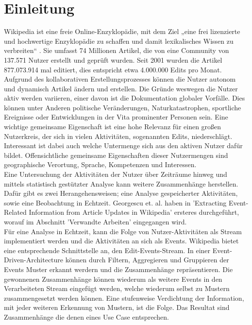 \section{Einleitung}
Wikipedia ist eine freie Online-Enzyklopädie, mit dem Ziel „eine frei lizenzierte und hochwertige Enzyklopädie zu schaffen und damit lexikalisches Wissen zu verbreiten“ \cite{wales.}. Sie umfasst 74 Millionen Artikel, die von eine Community von 137.571 Nutzer erstellt und geprüft wurden. Seit 2001 wurden die Artikel 877.073.914 mal editiert, dies entspricht etwa 4.000.000 Edits pro Monat. \cite{wikistat}\\

Aufgrund des kollaborativen Erstellungsprozesses können die Nutzer autonom und dynamisch Artikel ändern und erstellen. \cite{wikipedia.}
Die Gründe weswegen die Nutzer aktiv werden variieren, einer davon ist die Dokumentation globaler Vorfälle. Dies können unter Anderen politische Veränderungen, Naturkatastrophen, sportliche Ereignisse oder Entwicklungen in der Vita prominenter Personen sein. Eine wichtige gemeinsame Eigenschaft ist eine hohe Relevanz für einen großen Nutzerkreis, der sich in vielen Aktivitäten, sogenannten Edits, niederschlägt. Interessant ist dabei auch welche Untermenge sich aus den aktiven Nutzer dafür bildet. Offensichtliche gemeinsame Eigenschaften dieser Nutzermengen sind geographische Verortung, Sprache, Kompetenzen und Interessen. \cite{10.1007978-3-642-36973-5_22}\\

Eine Untersuchung der Aktivitäten der Nutzer über Zeiträume hinweg und mittels statistisch gestützter Analyse kann weitere Zusammenhänge herstellen. Dafür gibt es zwei Herangehensweisen; eine Analyse gespeicherter Aktivitäten, sowie eine Beobachtung in Echtzeit. Georgescu et. al. \cite{10.1007978-3-642-36973-5_22} haben in 'Extracting Event-Related Information from Article Updates in Wikipedia' ersteres durchgeführt, worauf im Abschnitt 'Verwandte Arbeiten' eingegangen wird. \\

Für eine Analyse in Echtzeit, kann die Folge von Nutzer-Aktivitäten als Stream implementiert werden und die Aktivitäten an sich als Events. Wikipedia bietet eine entsprechende Schnittstelle an, den Edit-Events-Stream. In einer Event-Driven-Architecture können durch Filtern, Aggregieren und Gruppieren der Events Muster erkannt werdern und die Zusammenhänge repräsentieren. Die gewonnenen Zusammenhänge können wiederum als weitere Events in den Verarbeiteten Stream eingefügt werden, welche wiederum selbst zu Mustern zusammengesetzt werden können. Eine stufenweise Verdichtung der Information, mit jeder weiteren Erkennung von Mustern, ist die Folge. Das Resultat sind Zusammenhänge die denen eines Use Case entsprechen.


